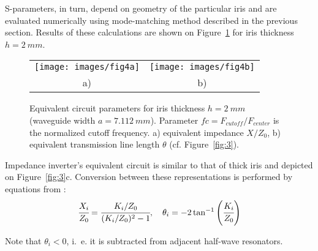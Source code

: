 \documentclass{pj}
\begin{document}
S-parameters, in turn, depend on geometry of the particular iris and
are evaluated numerically using mode-matching method described in
the previous section. Results of these calculations are shown on
Figure~\ref{fig:4} for iris thickness $h = 2~mm$.

\begin{figure}[h]
  \begin{tabular}{cc}
    \texttt{[image: images/fig4a]} &
                                           \texttt{[image: images/fig4b]}
    \\
    a) & b) \\
  \end{tabular}
  \caption{Equivalent circuit parameters for iris thickness $h = 2~mm$
    (waveguide width $a = 7.112~mm$). Parameter
    $fc = F_{cutoff}/F_{center}$ is the normalized cutoff
    frequency. a) equivalent impedance $X/Z_0$, b) equivalent
    transmission line length $\theta$
    (cf. Figure~\ref{fig:3}).}
  \label{fig:4}
\end{figure}


Impedance inverter's equivalent circuit is similar to that of thick
iris and depicted on Figure~\ref{fig:3}c. Conversion between these
representations is performed by equations from
\cite{pozar2012microwave}:
\begin{equation}
  \label{eq:10}
  \cfrac{X_i}{Z_0} = \cfrac{K_i/Z_0}{(K_i/Z_0)^2-1},
  \quad
  \theta_i = - 2 \tan^{-1}{\left(\cfrac{K_i}{Z_0}\right)}
\end{equation}

Note that $\theta_i < 0$, i.~e. it is subtracted from adjacent half-wave
resonators.
\end{document}
